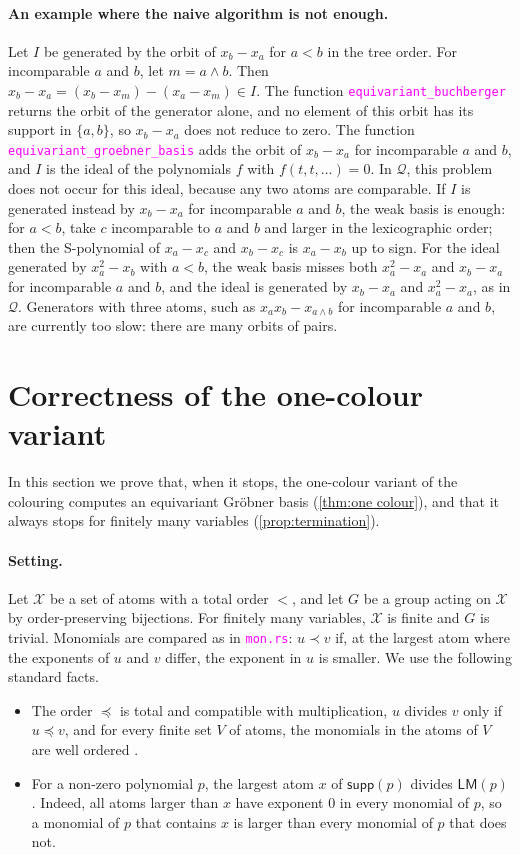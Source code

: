 \documentclass[12pt,a4paper,article]{memoir}
\newcommand{\struct}{\mathcal{X}}
\newcommand{\dloQ}{\mathcal{Q}}
\newcommand{\code}[1]{\texttt{\textcolor{magenta}{#1}}}
\newcommand{\supp}{\mathsf{supp}}
\newcommand{\LM}{\mathsf{LM}}
\theoremstyle{definition}
\begin{document}
\paragraph{An example where the naive algorithm is not enough.}
Let $I$ be generated by the orbit of $x_b - x_a$ for $a < b$ in the tree order.
For incomparable $a$ and $b$, let $m = a \wedge b$.
Then $x_b - x_a = (x_b - x_m) - (x_a - x_m) \in I$.
The function \code{equivariant\_buchberger} returns the orbit of the generator alone,
and no element of this orbit has its support in $\{a, b\}$,
so $x_b - x_a$ does not reduce to zero.
The function \code{equivariant\_groebner\_basis} adds the orbit of $x_b - x_a$ for incomparable $a$ and $b$,
and $I$ is the ideal of the polynomials $f$ with $f(t, t, \dots) = 0$.
In $\dloQ$, this problem does not occur for this ideal, because any two atoms are comparable.
If $I$ is generated instead by $x_b - x_a$ for incomparable $a$ and $b$, the weak basis is enough:
for $a < b$, take $c$ incomparable to $a$ and $b$ and larger in the lexicographic order;
then the S-polynomial of $x_a - x_c$ and $x_b - x_c$ is $x_a - x_b$ up to sign.
For the ideal generated by $x_a^2 - x_b$ with $a < b$,
the weak basis misses both $x_a^2 - x_a$ and $x_b - x_a$ for incomparable $a$ and $b$,
and the ideal is generated by $x_b - x_a$ and $x_a^2 - x_a$, as in $\dloQ$.
Generators with three atoms, such as $x_a x_b - x_{a \wedge b}$ for incomparable $a$ and $b$,
are currently too slow: there are many orbits of pairs.
%
\section{Correctness of the one-colour variant}\label{sec:one colour}
%
In this section we prove that, when it stops, the one-colour variant of the colouring
computes an equivariant Gr\"{o}bner basis (\cref{thm:one colour}),
and that it always stops for finitely many variables (\cref{prop:termination}).

\paragraph{Setting.}
Let $\struct$ be a set of atoms with a total order $<$,
and let $G$ be a group acting on $\struct$ by order-preserving bijections.
For finitely many variables, $\struct$ is finite and $G$ is trivial.
Monomials are compared as in \code{mon.rs}:
$u \prec v$ if, at the largest atom where the exponents of $u$ and $v$ differ, the exponent in $u$ is smaller.
We use the following standard facts.
\begin{itemize}
\item[(O1)] The order $\preceq$ is total and compatible with multiplication, $u$ divides $v$ only if $u \preceq v$,
and for every finite set $V$ of atoms, the monomials in the atoms of $V$ are well ordered
\cite[Chapter 2, \S 4]{CLO15}.
\item[(O2)] For a non-zero polynomial $p$, the largest atom $x$ of $\supp(p)$ divides $\LM(p)$
\cite[Section 2]{GL25}.
Indeed, all atoms larger than $x$ have exponent $0$ in every monomial of $p$,
so a monomial of $p$ that contains $x$ is larger than every monomial of $p$ that does not.
\end{itemize}
\end{document}
